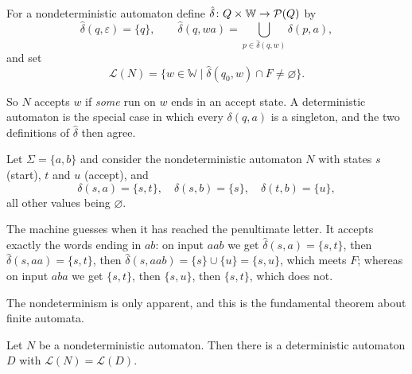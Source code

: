 \documentclass[a4paper]{scrartcl}
\newcommand{\WW}{\mathbb{W}}
\newcommand{\lang}{\mathcal{L}}
\newcommand{\eps}{\varepsilon}
\newcommand{\initarr}[2]{\draw[tra] ($(#1)+#2$) -- (#1);}
\begin{document}
\begin{definition}
	For a nondeterministic automaton define $\hat\delta \colon Q \times \WW \to \power(Q)$ by
	$$\hat\delta(q, \eps) = \{q\}, \qquad \hat\delta(q, wa) = \bigcup_{p \in \hat\delta(q,w)} \delta(p,a),$$
	and set
	$$\lang(N) = \{w \in \WW \mid \hat\delta(q_0, w) \cap F \neq \varnothing\}.$$
\end{definition}

So $N$ accepts $w$ if \emph{some} run on $w$ ends in an accept state. A deterministic automaton is the special case in which every $\delta(q,a)$ is a singleton, and the two definitions of $\hat\delta$ then agree.

\begin{example}\label{ex:nfaendab}
	Let $\Sigma = \{a,b\}$ and consider the nondeterministic automaton $N$ with states $s$ (start), $t$ and $u$ (accept), and
	$$\delta(s,a) = \{s,t\}, \quad \delta(s,b) = \{s\}, \quad \delta(t,b) = \{u\},$$
	all other values being $\varnothing$.
	\begin{center}
	\end{center}
	The machine guesses when it has reached the penultimate letter. It accepts exactly the words ending in $ab$: on input $aab$ we get $\hat\delta(s,a) = \{s,t\}$, then $\hat\delta(s,aa) = \{s,t\}$, then $\hat\delta(s,aab) = \{s\} \cup \{u\} = \{s,u\}$, which meets $F$; whereas on input $aba$ we get $\{s,t\}$, then $\{s,u\}$, then $\{s,t\}$, which does not.
\end{example}

The nondeterminism is only apparent, and this is the fundamental theorem about finite automata.

\begin{theorem}\label{thm:subset}
	Let $N$ be a nondeterministic automaton. Then there is a deterministic automaton $D$ with $\lang(N) = \lang(D)$.
\end{theorem}
\end{document}
